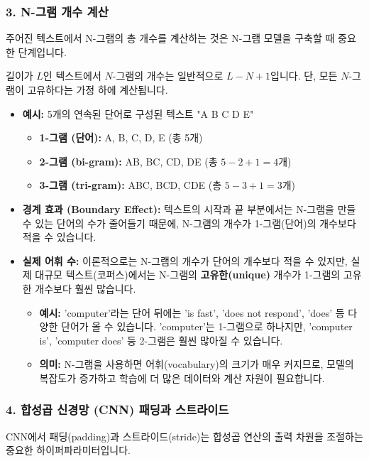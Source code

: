 \documentclass[11pt,a4paper]{article}
\theoremstyle{definition}
\begin{document}
\subsubsection{3. N-그램 개수 계산}
주어진 텍스트에서 N-그램의 총 개수를 계산하는 것은 N-그램 모델을 구축할 때 중요한 단계입니다.

\begin{tcolorbox}[summarybox, title=N-그램 개수 계산 공식]
길이가 $L$인 텍스트에서 $N$-그램의 개수는 일반적으로 $L - N + 1$입니다.
단, 모든 $N$-그램이 고유하다는 가정 하에 계산됩니다.
\end{tcolorbox}

\begin{itemize}
    \item \textbf{예시:} 5개의 연속된 단어로 구성된 텍스트 "A B C D E"
    \begin{itemize}
        \item \textbf{1-그램 (단어):} A, B, C, D, E (총 5개)
        \item \textbf{2-그램 (bi-gram):} AB, BC, CD, DE (총 $5 - 2 + 1 = 4$개)
        \item \textbf{3-그램 (tri-gram):} ABC, BCD, CDE (총 $5 - 3 + 1 = 3$개)
    \end{itemize}
    \item \textbf{경계 효과 (Boundary Effect):} 텍스트의 시작과 끝 부분에서는 N-그램을 만들 수 있는 단어의 수가 줄어들기 때문에, N-그램의 개수가 1-그램(단어)의 개수보다 적을 수 있습니다.
    \item \textbf{실제 어휘 수:} 이론적으로는 N-그램의 개수가 단어의 개수보다 적을 수 있지만, 실제 대규모 텍스트(코퍼스)에서는 N-그램의 \textbf{고유한(unique)} 개수가 1-그램의 고유한 개수보다 훨씬 많습니다.
    \begin{itemize}
        \item \textbf{예시:} 'computer'라는 단어 뒤에는 'is fast', 'does not respond', 'does' 등 다양한 단어가 올 수 있습니다. 'computer'는 1-그램으로 하나지만, 'computer is', 'computer does' 등 2-그램은 훨씬 많아질 수 있습니다.
        \item \textbf{의미:} N-그램을 사용하면 어휘(vocabulary)의 크기가 매우 커지므로, 모델의 복잡도가 증가하고 학습에 더 많은 데이터와 계산 자원이 필요합니다.
    \end{itemize}
\end{itemize}

\subsubsection{4. 합성곱 신경망 (CNN) 패딩과 스트라이드}
CNN에서 패딩(padding)과 스트라이드(stride)는 합성곱 연산의 출력 차원을 조절하는 중요한 하이퍼파라미터입니다.
\end{document}
